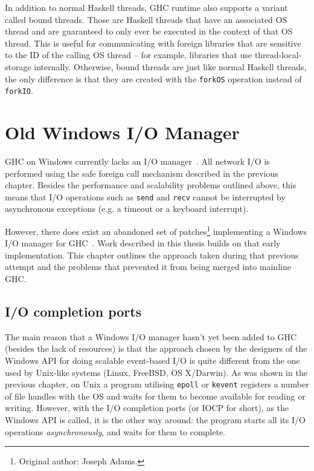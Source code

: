 \documentclass[a4paper,11pt,oneside]{report}
\begin{document}
In addition to normal Haskell threads, GHC runtime also supports a variant
called bound threads. Those are Haskell threads that have an associated OS
thread and are guaranteed to only ever be executed in the context of that OS
thread. This is useful for communicating with foreign libraries that are
sensitive to the ID of the calling OS thread -- for example, libraries that use
thread-local-storage internally. Otherwise, bound threads are just like normal
Haskell threads, the only difference is that they are created with the
\texttt{forkOS} operation instead of \texttt{forkIO}.

\chapter{Old Windows I/O Manager}
\label{chap:old-io-manager}

GHC on Windows currently lacks an I/O manager~\cite{bib:ticket7353}. All network
I/O is performed using the safe foreign call mechanism described in the previous
chapter. Besides the performance and scalability problems outlined above, this
means that I/O operations such as \texttt{send} and \texttt{recv} cannot be
interrupted by asynchronous exceptions (e.g. a timeout or a keyboard interrupt).

However, there does exist an abandoned set of patches\footnote{Original author:
  Joseph Adams.} implementing a Windows I/O manager for
GHC~\cite{bib:ticket7353}. Work described in this thesis builds on that early
implementation. This chapter outlines the approach taken during that previous
attempt and the problems that prevented it from being merged into mainline GHC.

\section{I/O completion ports}

The main reason that a Windows I/O manager hasn't yet been added to GHC (besides
the lack of resources) is that the approach chosen by the designers of the
Windows API for doing scalable event-based I/O is quite different from the one
used by Unix-like systems (Linux, FreeBSD, OS X/Darwin). As was shown in the
previous chapter, on Unix a program utilising \texttt{epoll} or \texttt{kevent}
registers a number of file handles with the OS and waits for them to become
available for reading or writing. However, with the I/O completion ports (or
IOCP for short), as the Windows API is called, it is the other way around: the
program starts all its I/O operations \textit{asynchronously}, and waits for
them to complete.
\end{document}
